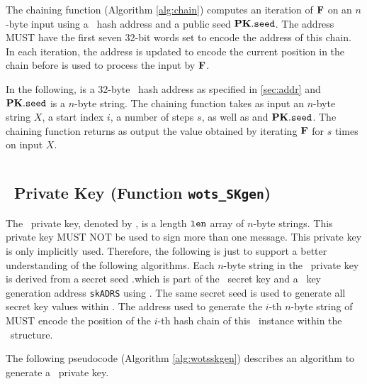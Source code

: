 The chaining function (Algorithm \ref{alg:chain}) computes an iteration of $\mathbf{F}$ on an $n$-byte input using
a \WOTSCS\ hash address \ADRS and a public seed $\mathbf{PK}.\mathtt{seed}$. The address \ADRS MUST
have the first seven 32-bit words set to encode the address of this chain. In each iteration, the address is updated to encode the current position in the chain before \ADRS is used to process the input by $\mathbf{F}$.

In the following, \ADRS is a 32-byte \WOTSCS\ hash address as specified in \cref{sec:addr} and $\mathbf{PK}.\mathtt{seed}$ is a $n$-byte string. The chaining function takes as input an $n$-byte string $X$, a start index $i$, a number of steps $s$, as well as \ADRS and $\mathbf{PK}.\mathtt{seed}$. The chaining function returns as output the value obtained by iterating $\mathbf{F}$ for $s$ times on input $X$.

\begin{algorithm}
\inputminted[breaklines,linenos,tabsize=2,mathescape,escapeinside=||]{C}{code/chain.cs}
\caption{{\tt chain} --- Chaining function used in \WOTSCS.}
\label{alg:chain}
\end{algorithm}


\subsection{\WOTSCS\ Private Key (Function \texttt{wots\_SKgen})}

The \WOTSCS\ private key, denoted by \sk, is a length $\tt len$ array of $n$-byte strings. This private key MUST NOT be used to sign more than one message. This private key is only implicitly used. Therefore, the following is just to support a better understanding of the following algorithms. Each $n$-byte string in the \WOTSCS\ private key is derived from a secret seed \sk.\seed which is part of the \SPHINCSA\ secret key and a \WOTSCS\ key generation address \texttt{skADRS} using \PRF. The same secret seed is used to generate all secret key values within \SPHINCSA. The address used to generate the $i$-th $n$-byte string of \sk MUST encode the position of the $i$-th hash chain of this \WOTSCS\ instance within the \SPHINCSA\ structure. 

The following pseudocode (Algorithm \ref{alg:wotsskgen}) describes an algorithm to generate a \WOTSCS\ private key.

\begin{algorithm}
\inputminted[breaklines,linenos,tabsize=2,mathescape,escapeinside=||]{C}{code/wots_SKgen.cs}
\caption{\texttt{wots\_SKgen} --- Generating a \WOTSCS\ private key.}
\label{alg:wotsskgen}
\end{algorithm}

